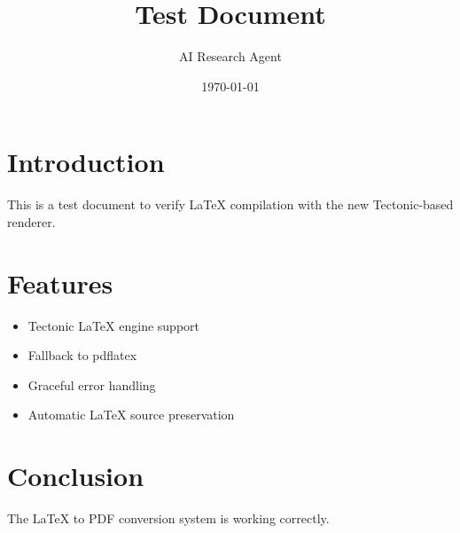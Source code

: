 \documentclass{article}
\title{Test Document}
\author{AI Research Agent}
\date{\today}
\begin{document}
\maketitle

\section{Introduction}
This is a test document to verify LaTeX compilation with the new Tectonic-based renderer.

\section{Features}
\begin{itemize}
\item Tectonic LaTeX engine support
\item Fallback to pdflatex
\item Graceful error handling
\item Automatic LaTeX source preservation
\end{itemize}

\section{Conclusion}
The LaTeX to PDF conversion system is working correctly.
\end{document}
